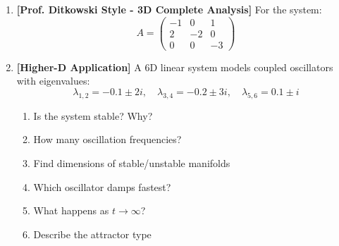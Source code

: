 \documentclass[12pt]{article}
\begin{document}
\begin{enumerate}[resume]
\item \textbf{[Prof. Ditkowski Style - 3D Complete Analysis]}
For the system:
$$A = \begin{pmatrix} -1 & 0 & 1 \\ 2 & -2 & 0 \\ 0 & 0 & -3 \end{pmatrix}$$

\item \textbf{[Higher-D Application]}
A 6D linear system models coupled oscillators with eigenvalues:
$$\lambda_{1,2} = -0.1 \pm 2i, \quad \lambda_{3,4} = -0.2 \pm 3i, \quad \lambda_{5,6} = 0.1 \pm i$$
\begin{enumerate}[label=(\alph*)]
    \item Is the system stable? Why?
    \item How many oscillation frequencies?
    \item Find dimensions of stable/unstable manifolds
    \item Which oscillator damps fastest?
    \item What happens as $t \to \infty$?
    \item Describe the attractor type
\end{enumerate}


\end{enumerate}
\end{document}
